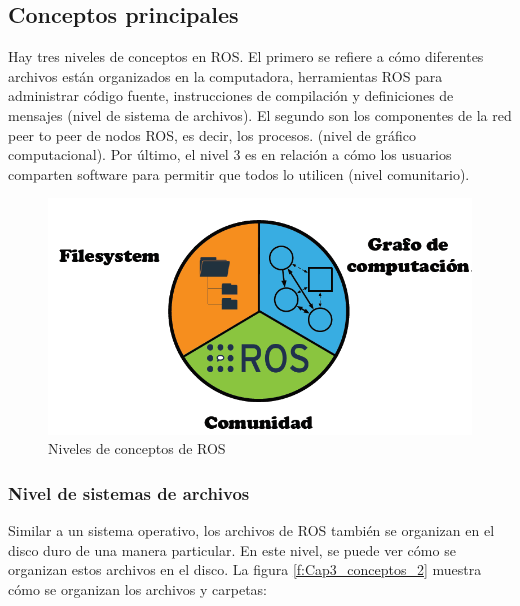     \newpage
    
    \subsection{Conceptos principales}
            
            Hay tres niveles de conceptos en ROS. El primero se refiere a cómo diferentes archivos están organizados en la computadora, herramientas ROS para administrar código fuente, instrucciones de compilación y definiciones de mensajes (nivel de sistema de archivos). El segundo son los componentes de la red peer to peer de nodos ROS, es decir, los procesos. (nivel de gráfico computacional). Por último, el nivel 3 es en relación a cómo los usuarios comparten software para permitir que todos lo utilicen (nivel comunitario).
            
            \begin{figure}[htb]
                \centering
                \includegraphics[width=1\linewidth]{Main/Chapter3/Images3/nivel_s_a_1.png}
                \caption{Niveles de conceptos de ROS}
                \label{f:Cap3_conceptos_1}
            \end{figure} 
            

                
                
               \newpage
               
            \subsubsection{Nivel de sistemas de archivos}

                Similar a un sistema operativo, los archivos de ROS también se organizan en el disco duro de una manera particular. En este nivel, se puede ver cómo se organizan estos archivos en el disco. La figura \eqref{f:Cap3_conceptos_2} muestra cómo se organizan los archivos y carpetas:
                
